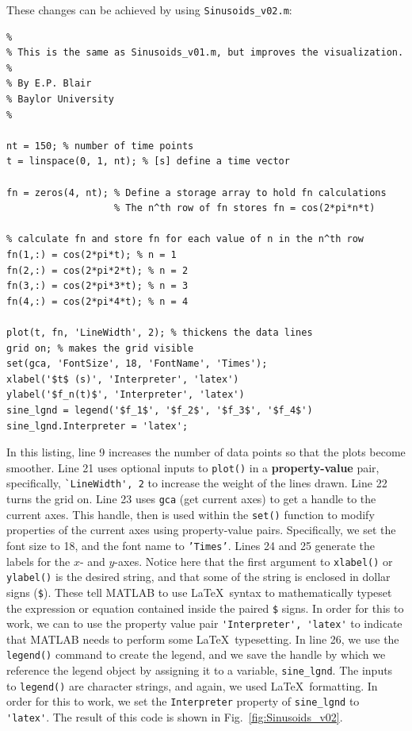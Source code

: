 These changes can be achieved by using \verb!Sinusoids_v02.m!:
\begin{lstlisting}[style=Matlab-editor,label=lstSinusoids_v02, caption={Listing of the \texttt{Sinusoids\_v02.m} script.}]
% Sinusoids_v02.m
% 
% This is the same as Sinusoids_v01.m, but improves the visualization.
%
% By E.P. Blair
% Baylor University
%

nt = 150; % number of time points
t = linspace(0, 1, nt); % [s] define a time vector

fn = zeros(4, nt); % Define a storage array to hold fn calculations
                   % The n^th row of fn stores fn = cos(2*pi*n*t)
      
% calculate fn and store fn for each value of n in the n^th row
fn(1,:) = cos(2*pi*t); % n = 1
fn(2,:) = cos(2*pi*2*t); % n = 2
fn(3,:) = cos(2*pi*3*t); % n = 3
fn(4,:) = cos(2*pi*4*t); % n = 4

plot(t, fn, 'LineWidth', 2); % thickens the data lines
grid on; % makes the grid visible
set(gca, 'FontSize', 18, 'FontName', 'Times');
xlabel('$t$ (s)', 'Interpreter', 'latex')
ylabel('$f_n(t)$', 'Interpreter', 'latex')
sine_lgnd = legend('$f_1$', '$f_2$', '$f_3$', '$f_4$')
sine_lgnd.Interpreter = 'latex';
\end{lstlisting}
In this listing, line 9 increases the number of data points so that the plots become smoother. Line 21 uses optional inputs to \verb!plot()! in a \textbf{property-value} pair, specifically, \verb!`LineWidth', 2! to increase the weight of the lines drawn. Line 22 turns the grid on. Line 23 uses \texttt{gca} (get current axes) to get a handle to the current axes. This handle, then is used within the \texttt{set()} function to modify properties of the current axes using property-value pairs. Specifically, we set the font size to 18, and the font name to \texttt{'Times'}. Lines 24 and 25 generate the labels for the $x$- and $y$-axes. Notice here that the first argument to \texttt{xlabel()} or \texttt{ylabel()} is the desired string, and that some of the string is enclosed in dollar signs (\verb!$!). These tell MATLAB to use \LaTeX \, syntax to mathematically typeset the expression or equation contained inside the paired \verb!$! signs. In order for this to work, we can to use the property value pair \verb!'Interpreter', 'latex'! to indicate that MATLAB needs to perform some \LaTeX \, typesetting. In line 26, we use the \texttt{legend()} command to create the legend, and we save the handle by which we reference the legend object by assigning it to a variable, \verb!sine_lgnd!. The inputs to \texttt{legend()} are character strings, and again, we used \LaTeX \, formatting. In order for this to work, we set the \texttt{Interpreter} property of \verb!sine_lgnd!  to \verb!'latex'!. The result of this code is shown in Fig.\ \ref{fig:Sinusoids_v02}.

